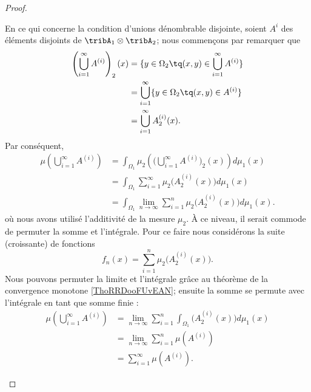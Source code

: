 \begin{proof}
\begin{subproof}
    En ce qui concerne la condition d'unions dénombrable disjointe, soient \( A^{i}\) des éléments disjoints de \( \tribA_1\otimes \tribA_2\); nous commençons par remarquer que
    \begin{subequations}
        \begin{align}
            \left( \bigcup_{i=1}^{\infty}A^{(i)} \right)_2(x)&=\{ y\in\Omega_2\tq (x,y)\in\bigcup_{i=1}^{\infty}A^{(i)} \}\\
            &=\bigcup_{i=1}^{\infty}\{ y\in\Omega_2\tq (x,y)\in A^{(i)} \}\\
            &=\bigcup_{i=1}^{\infty}A^{(i)}_2(x).
        \end{align}
    \end{subequations}
    Par conséquent,
    \begin{subequations}
        \begin{align}
            \mu\left( \bigcup_{i=1}^{\infty}A^{(i)} \right)&=\int_{\Omega_1}\mu_2\left(    \Big( \bigcup_{i=1}^{\infty}A^{(i)} \Big)_2(x)     \right)d\mu_1(x)\\
            &=\int_{\Omega_1}\sum_{i=1}^{\infty}\mu_2\big( A^{(i)}_2(x) \big)d\mu_1(x)\\
            &=\int_{\Omega_1}\lim_{n\to \infty} \sum_{i=1}^{n}\mu_2\big( A^{(i)}_2(x) \big)d\mu_1(x).
        \end{align}
    \end{subequations}
    où nous avons utilisé l'additivité de la mesure \( \mu_2\). À ce niveau, il serait commode de permuter la somme et l'intégrale. Pour ce faire nous considérons la suite (croissante) de fonctions
    \begin{equation}
        f_n(x)=\sum_{i=1}^n\mu_2\big( A_2^{(i)}(x) \big).
    \end{equation}
    Nous pouvons permuter la limite et l'intégrale grâce au théorème de la convergence monotone \ref{ThoRRDooFUvEAN}; ensuite la somme se permute avec l'intégrale en tant que somme finie :
    \begin{subequations}
        \begin{align}
            \mu\left( \bigcup_{i=1}^{\infty}A^{(i)} \right)&=\lim_{n\to \infty} \sum_{i=1}^n\int_{\Omega_1}\big( A_2^{(i)}(x) \big)d\mu_1(x)\\
            &=\lim_{n\to \infty} \sum_{i=1}^n\mu(A^{(i)})\\
            &=\sum_{i=1}^{\infty}\mu( A^{(i)} ).
        \end{align}
    \end{subequations}


\end{subproof}
\end{proof}
